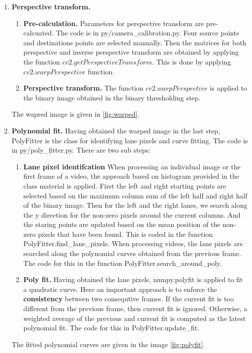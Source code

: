 \documentclass[12pt]{article}
\begin{document}
\begin{enumerate}
	\item \textbf{Perspective transform.} 
		\begin{enumerate}
			\item \textbf{Pre-calculation.} Parameters for perspective transform are pre-calcuated. The code is in py/camera\_calibration.py. Four source points and destinations points are selected manually. Then the matrices for both perspective and inverse perspective transform are obtained by applying the function $cv2.getPerspectiveTransform$. This is done by applying $cv2.warpPerspective$ function.
			
			\item \textbf{Perspective transform.} The function $cv2.warpPerspective$ is applied to the binary image obtained in the binary thresholding step.
		\end{enumerate}
	The wapred image is given in \ref{fig:warped}.
	
	\item \textbf{Polynomial fit.} Having obtained the warped image in the last step, PolyFitter is the class for identifying lane pixels and curve fitting. The code is in py/poly\_fitter.py. There are two sub steps:
		\begin{enumerate}
			\item \textbf{Lane pixel identifcation} When processing an individual image or the first frame of a video, the approach based on histogram provided in the class material is applied. First the left and right starting points are selected based on the maximum column sum of the left half and right half of the binary image. Then for the left and the right lanes, we search along the y direction for the non-zero pixels around the current columns. And the staring points are updated based on the mean position of the non-zero pixels that have been found. This is coded in the function PolyFitter.find\_lane\_pixels. When processing videos, the lane pixels are searched along the polynomial curves obtained from the previous frame. The code for this in the function PolyFitter.search\_around\_poly.
			
			\item \textbf {Poly fit.} Having obtained the lane pixels, numpy.polyfit is applied to fit a quadratic curve. Here an important approach is to enforce the \textbf{consistency} between two consequtive frames. If the current fit is too different from the previous frame, then current fit is ignored. Otherwise, a weighted average of the previous and current fit is computed as the latest polynomial fit. The code for this in PolyFitter.update\_fit.
		\end{enumerate}
	The fitted polynomial curves are given in the image \ref{fig:polyfit}.
	

\end{enumerate}
\end{document}
